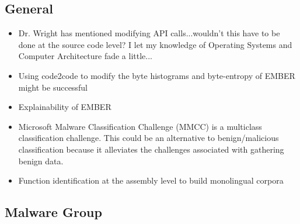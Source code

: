 \documentclass{article}
\begin{document}
\subsection*{General}
\begin{itemize}
	\item Dr. Wright has mentioned modifying API calls...wouldn't this have to be done at the source code level? I let my knowledge of Operating Systems and Computer Architecture fade a little...
	\item Using code2code to modify the byte histograms and byte-entropy of EMBER might be successful
	\item Explainability of EMBER
	\item Microsoft Malware Classification Challenge (MMCC) is a multiclass classification challenge. This could be an alternative to benign/malicious classification because it alleviates the challenges associated with gathering benign data.
	\item Function identification at the assembly level to build monolingual corpora
\end{itemize}

\subsection*{Malware Group}
\end{document}
